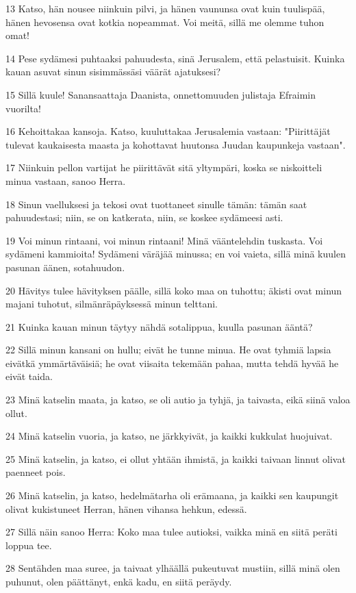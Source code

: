 \par 13 Katso, hän nousee niinkuin pilvi, ja hänen vaununsa ovat kuin tuulispää, hänen hevosensa ovat kotkia nopeammat. Voi meitä, sillä me olemme tuhon omat!
\par 14 Pese sydämesi puhtaaksi pahuudesta, sinä Jerusalem, että pelastuisit. Kuinka kauan asuvat sinun sisimmässäsi väärät ajatuksesi?
\par 15 Sillä kuule! Sanansaattaja Daanista, onnettomuuden julistaja Efraimin vuorilta!
\par 16 Kehoittakaa kansoja. Katso, kuuluttakaa Jerusalemia vastaan: "Piirittäjät tulevat kaukaisesta maasta ja kohottavat huutonsa Juudan kaupunkeja vastaan".
\par 17 Niinkuin pellon vartijat he piirittävät sitä yltympäri, koska se niskoitteli minua vastaan, sanoo Herra.
\par 18 Sinun vaelluksesi ja tekosi ovat tuottaneet sinulle tämän: tämän saat pahuudestasi; niin, se on katkerata, niin, se koskee sydämeesi asti.
\par 19 Voi minun rintaani, voi minun rintaani! Minä vääntelehdin tuskasta. Voi sydämeni kammioita! Sydämeni väräjää minussa; en voi vaieta, sillä minä kuulen pasunan äänen, sotahuudon.
\par 20 Hävitys tulee hävityksen päälle, sillä koko maa on tuhottu; äkisti ovat minun majani tuhotut, silmänräpäyksessä minun telttani.
\par 21 Kuinka kauan minun täytyy nähdä sotalippua, kuulla pasunan ääntä?
\par 22 Sillä minun kansani on hullu; eivät he tunne minua. He ovat tyhmiä lapsia eivätkä ymmärtäväisiä; he ovat viisaita tekemään pahaa, mutta tehdä hyvää he eivät taida.
\par 23 Minä katselin maata, ja katso, se oli autio ja tyhjä, ja taivasta, eikä siinä valoa ollut.
\par 24 Minä katselin vuoria, ja katso, ne järkkyivät, ja kaikki kukkulat huojuivat.
\par 25 Minä katselin, ja katso, ei ollut yhtään ihmistä, ja kaikki taivaan linnut olivat paenneet pois.
\par 26 Minä katselin, ja katso, hedelmätarha oli erämaana, ja kaikki sen kaupungit olivat kukistuneet Herran, hänen vihansa hehkun, edessä.
\par 27 Sillä näin sanoo Herra: Koko maa tulee autioksi, vaikka minä en siitä peräti loppua tee.
\par 28 Sentähden maa suree, ja taivaat ylhäällä pukeutuvat mustiin, sillä minä olen puhunut, olen päättänyt, enkä kadu, en siitä peräydy.
